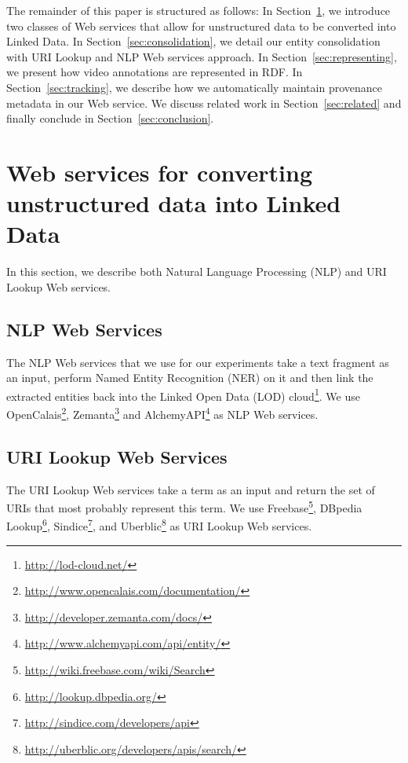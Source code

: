 \documentclass{acm_proc_article-sp}
\begin{document}
The remainder of this paper is structured as follows: In Section~\ref{sec:services}, we introduce two classes of Web
services that allow for unstructured data to be converted into Linked Data. In Section~\ref{sec:consolidation}, we
detail our entity consolidation with URI Lookup and NLP Web services approach. In Section~\ref{sec:representing}, we
present how video annotations are represented in RDF. In Section~\ref{sec:tracking}, we describe how we automatically
maintain provenance metadata in our Web service. We discuss related work in Section~\ref{sec:related} and finally
conclude in Section~\ref{sec:conclusion}.


\section{Web services for converting unstructured data into Linked Data}    \label{sec:services}
In this section, we describe both Natural Language Processing (NLP) and URI Lookup Web services.

\subsection{NLP Web Services}                                               \label{sec:nlp}
The NLP Web services that we use for our experiments take a text fragment as an input, perform Named Entity Recognition
(NER) on it and then link the extracted entities back into the Linked Open Data (LOD)
cloud\footnote{\url{http://lod-cloud.net/}}. We use
OpenCalais\footnote{\url{http://www.opencalais.com/documentation/}},
Zemanta\footnote{\url{http://developer.zemanta.com/docs/}} and
AlchemyAPI\footnote{\url{http://www.alchemyapi.com/api/entity/}} as NLP Web services.


\subsection{URI Lookup Web Services}                                        \label{sec:urilookup}
The URI Lookup Web services take a term as an input and return the set of URIs that most probably represent this term.
We use Freebase\footnote{\url{http://wiki.freebase.com/wiki/Search}}, DBpedia
Lookup\footnote{\url{http://lookup.dbpedia.org/}}, Sindice\footnote{\url{http://sindice.com/developers/api}}, and
Uberblic\footnote{\url{http://uberblic.org/developers/apis/search/}} as URI Lookup Web services.
\end{document}

